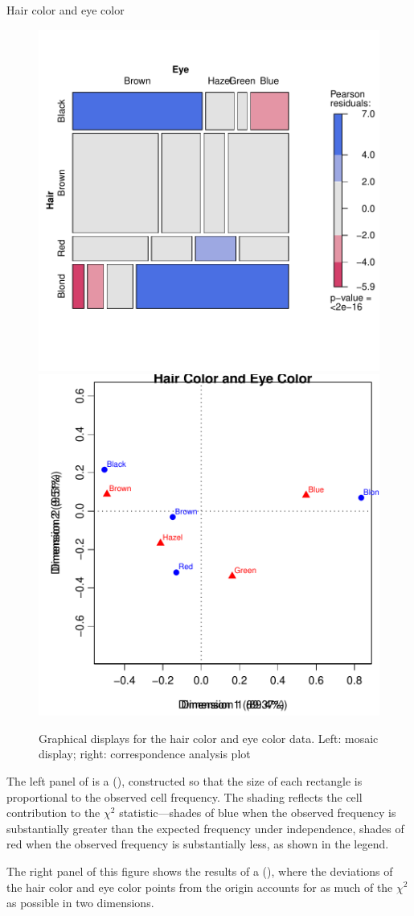 \documentclass[11pt]{book}\usepackage[]{graphicx}\usepackage[]{color}
\newenvironment{knitrout}{}{} %
\renewenvironment{knitrout}{\small\renewcommand{\baselinestretch}{.85}}{} %
\begin{document}
\begin{Example}[haireye0]{Hair color and eye color}
\begin{knitrout}
\color{fgcolor}\begin{figure}[htbp]


\centerline{\includegraphics[width=.49\textwidth]{ch01/fig/haireye021} 
\includegraphics[width=.49\textwidth]{ch01/fig/haireye022} }

\caption[Graphical displays for the hair color and eye color data]{Graphical displays for the hair color and eye color data. Left: mosaic display; right: correspondence analysis plot\label{fig:haireye02}}
\end{figure}


\end{knitrout}

The left panel of  is a 
(), constructed so that the size of each rectangle
is proportional to the observed cell frequency. The shading
reflects the cell contribution to the \(\chi^2\) statistic---shades of blue
when the observed frequency is substantially greater than the 
expected frequency under independence, shades of red when the observed frequency
is substantially less, as shown in the legend.

The right panel of this figure shows the results of 
a \ca (), where the deviations of the hair color and eye
color points from the origin accounts for as much of the \(\chi^2\)
as possible in two dimensions.


\end{Example}
\end{document}
